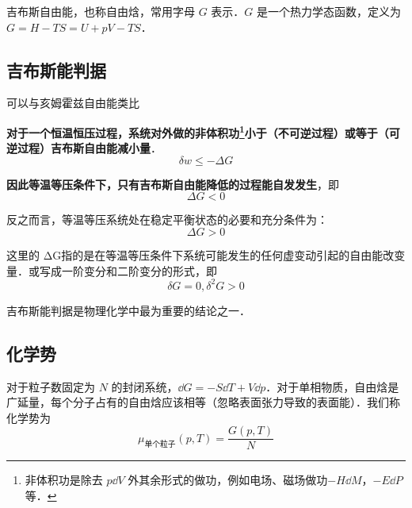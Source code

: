 
\begin{issues}
\end{issues}


吉布斯自由能，也称自由焓，常用字母 $G$ 表示．$G$ 是一个热力学态函数，定义为$G=H-TS=U+pV-TS$．

\subsection{吉布斯能判据}
可以与亥姆霍兹自由能类比

\begin{theorem}{}
\textbf{对于一个恒温恒压过程，系统对外做的非体积功\footnote{非体积功是除去 $p\dd V$ 外其余形式的做功，例如电场、磁场做功$-H\dd M$，$-E\dd P$ 等．}小于（不可逆过程）或等于（可逆过程）吉布斯自由能减小量}．
\begin{equation}
\delta w \le -\Delta G
\end{equation}
\end{theorem}

\begin{corollary}{}
\textbf{因此等温等压条件下，只有吉布斯自由能降低的过程能自发发生}，即
\begin{equation}
\Delta G<0
\end{equation}
\end{corollary}

\begin{corollary}{}
反之而言，等温等压系统处在稳定平衡状态的必要和充分条件为：
\begin{equation}
\Delta G>0
\end{equation}
\end{corollary}
这里的 ΔG指的是在等温等压条件下系统可能发生的任何虚变动引起的自由能改变量．或写成一阶变分和二阶变分的形式，即
\begin{equation}
\delta G=0,\delta^2 G>0
\end{equation}

吉布斯能判据是物理化学中最为重要的结论之一．

\subsection{化学势}

对于粒子数固定为 $N$ 的封闭系统，$\dd G=-S\dd T+V\dd p$．对于单相物质，自由焓是广延量，每个分子占有的自由焓应该相等（忽略表面张力导致的表面能）．我们称化学势为
\begin{equation}
\mu_{\text{单个粒子}}(p,T)=\frac{G(p,T)}{N}
\end{equation}

